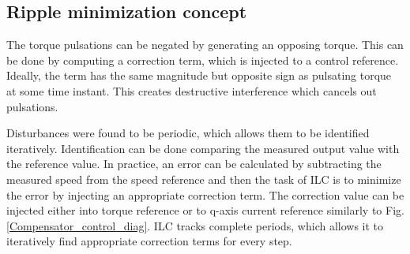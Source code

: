 

\subsection{Ripple minimization concept}

The torque pulsations can be negated by generating an opposing torque. This can be done by computing a correction term, which is injected to a control reference. Ideally, the term has the same magnitude but opposite sign as pulsating torque at some time instant. This creates destructive interference which cancels out pulsations.

Disturbances were found to be periodic, which allows them to be identified iteratively. Identification can be done comparing the measured output value with the reference value. In practice, an error can be calculated by subtracting the measured speed from the speed reference and then the task of ILC is to minimize the error by injecting an appropriate correction term. The correction value can be injected either into torque reference \cite{ILC:2004} or to q-axis current reference \cite{ILC:2005, ILC:2018} similarly to Fig. \ref{Compensator_control_diag}. ILC tracks complete periods, which allows it to iteratively find appropriate correction terms for every step.

